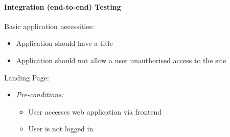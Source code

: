 \documentclass{article}
\begin{document}
			\paragraph{Integration (end-to-end) Testing}
				Basic application necessities:			
				\begin{itemize}
					\item Application should have a title
					\item Application should not allow a user unauthorised access to the site
				\end{itemize}
				Landing Page:
				\begin{itemize}
				 \item \textit{Pre-conditions:} 
					\begin{itemize}
						\item User accesses web application via frontend
						\item User is not logged in
					\end{itemize}
				\end{itemize}
\end{document}
